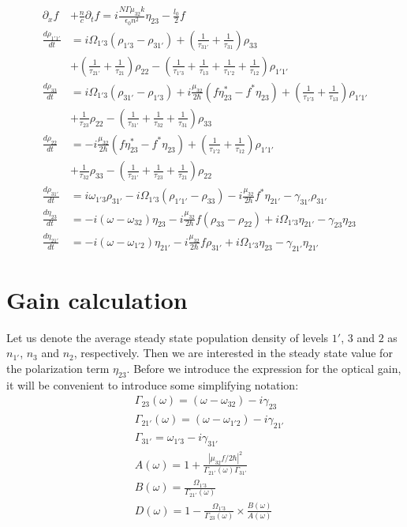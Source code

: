 \documentclass[10pt,english,fleqn]{article}%
\begin{document}
\begin{align}
\partial_{x}f &+\frac{n}{c}\partial_t f = i\frac{N \Gamma \mu_{32} k}{\epsilon_0 n^2} \eta_{23} - \frac{l_0}{2} f \label{eq:rtwaveq} \\
\frac{d \rho_{1'1'}}{d t} &= i\Omega_{1'3} (\rho_{1'3} - \rho_{31'}) + (\frac{1}{\tau_{31'}} + \frac{1}{\tau_{31}})\rho_{33} \nonumber \\ 
& + (\frac{1}{\tau_{21'}} + \frac{1}{\tau_{21}})\rho_{22} - (\frac{1}{\tau_{1'3}} + \frac{1}{\tau_{13}} + \frac{1}{\tau_{1'2}} + \frac{1}{\tau_{12}})\rho_{1'1'} \\
\frac{d \rho_{33}}{d t}   &= i\Omega_{1'3} (\rho_{31'} - \rho_{1'3}) + i\frac{\mu_{32} }{2 \hbar} (f \eta_{23}^*-f^*\eta_{23})+ (\frac{1}{\tau_{1'3}} + \frac{1}{\tau_{13}})\rho_{1'1'} \nonumber \\ 
& +  \frac{1}{\tau_{23}}\rho_{22} - (\frac{1}{\tau_{31'}} + \frac{1}{\tau_{32}} + \frac{1}{\tau_{31}}) \rho_{33} \\
\frac{d \rho_{22}}{d t}   &= -i\frac{\mu_{32} }{2 \hbar} (f \eta_{23}^*-f^*\eta_{23}) + (\frac{1}{\tau_{1'2}} + \frac{1}{\tau_{12}})\rho_{1'1'} \nonumber \\ 
& +  \frac{1}{\tau_{32}}\rho_{33} - (\frac{1}{\tau_{21'}} + \frac{1}{\tau_{23}} + \frac{1}{\tau_{21}}) \rho_{22} \\
\frac{d \rho_{31'}}{d t}  &= i\omega_{1'3}\rho_{31'} -i \Omega_{1'3}(\rho_{1'1'} - \rho_{33}) -i\frac{\mu_{32}}{2\hbar}f^*\eta_{21'} -\gamma_{31'}\rho_{31'} \\
\frac{d \eta_{23}}{d t}   &= -i(\omega - \omega_{32})\eta_{23} -i \frac{\mu_{32}}{2\hbar}f(\rho_{33}-\rho_{22}) +i\Omega_{1'3}\eta_{21'} - \gamma_{23}\eta_{23} \\
\frac{d \eta_{21'}}{d t}  &= -i(\omega - \omega_{1'2})\eta_{21'} -i\frac{\mu_{32}}{2\hbar}f\rho_{31'} +i\Omega_{1'3}\eta_{23} -\gamma_{21'}\eta_{21'} 
\end{align}

\section{Gain calculation}
\label{sec:gain-calculation}
Let us denote the average steady state population density of levels $1'$, $3$ and $2$ as $n_{1'}$, $n_3$ and $n_2$, respectively.  Then we are interested in the steady 
state value for the polarization term $\eta_23$.  Before we introduce the expression for the optical gain, it will be convenient to introduce some simplifying 
notation:
\begin{align}
 &\Gamma_{23}(\omega) = (\omega - \omega_{32}) - i\gamma_{23} \nonumber \\
 &\Gamma_{21'}(\omega) = (\omega - \omega_{1'2}) - i\gamma_{21'} \nonumber \\
 &\Gamma_{31'} = \omega_{1'3} - i\gamma_{31'} \nonumber \\
 &A(\omega) = 1+ \frac{|\mu_{32}f/2\hbar|^2}{\Gamma_{21'}(\omega)\Gamma_{31'}} \nonumber \\
 &B(\omega) = \frac{\Omega_{1'3}}{\Gamma_{21'}(\omega)} \nonumber \\
 &D(\omega) = 1-\frac{\Omega_{1'3}}{\Gamma_{23}(\omega)}\times \frac{B(\omega)}{A(\omega)}
\end{align}
\end{document}
